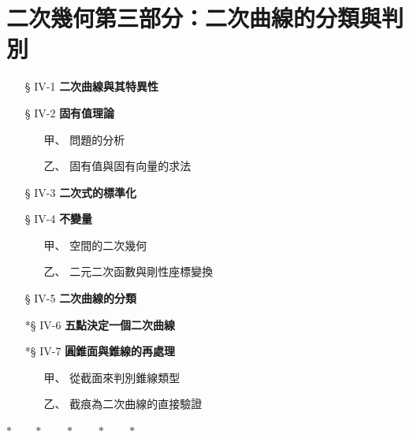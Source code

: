 
\section{二次幾何\texorpdfstring{\quad }{ }第三部分：二次曲線的分類與判別}
\label{sec:b4s-ch4}

\begin{center}
\begin{minipage}{0.75\textwidth}
\begin{itemize}[leftmargin=2em, itemsep=0.3em]
  \item[§ IV-1] \textbf{二次曲線與其特異性}
  \item[§ IV-2] \textbf{固有值理論}
  \begin{itemize}[leftmargin=2em, itemsep=0.2em]
    \item[甲、] 問題的分析
    \item[乙、] 固有值與固有向量的求法
  \end{itemize}
  \item[§ IV-3] \textbf{二次式的標準化}
  \item[§ IV-4] \textbf{不變量}
  \begin{itemize}[leftmargin=2em, itemsep=0.2em]
    \item[甲、] 空間的二次幾何
    \item[乙、] 二元二次函數與剛性座標變換
  \end{itemize}
  \item[§ IV-5] \textbf{二次曲線的分類}
  \item[*§ IV-6] \textbf{五點決定一個二次曲線}
  \item[*§ IV-7] \textbf{圓錐面與錐線的再處理}
  \begin{itemize}[leftmargin=2em, itemsep=0.2em]
    \item[甲、] 從截面來判別錐線類型
    \item[乙、] 截痕為二次曲線的直接驗證
  \end{itemize}
\end{itemize}
\end{minipage}
\end{center}

\begin{center}
$* \qquad * \qquad * \qquad * \qquad *$
\end{center}


